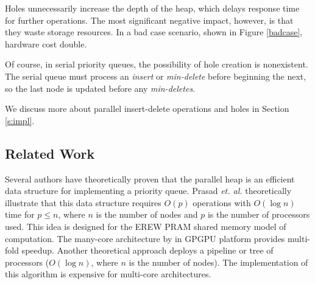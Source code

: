 Holes unnecessarily increase the depth of the heap, which delays response time for further operations.
The most significant negative impact, however, is that they waste storage resources.
In a bad case scenario, shown in Figure \ref{badcase}, hardware cost double.

Of course, in serial priority queues, the possibility of hole creation is nonexistent. 
The serial queue must process an {\it insert} or {\it min-delete} before beginning the next, so the last node is updated before any {\it min-deletes}.

We discuss more about parallel insert-delete operations and holes in Section \autoref{s:impl}.

\subsection{Related Work}
Several authors have theoretically proven that the parallel heap is an efficient data structure for implementing a priority queue.
Prasad {\it et. al.} \cite{pq3} theoretically illustrate that this data structure requires $O(p)$ operations with $O(\log n)$ time for $p \leq n$, where $n$ is the number of nodes and $p$ is the number of processors used.
This idea is designed for the EREW PRAM shared memory model of computation.
The many-core architecture by \cite{pq2} in GPGPU platform provides multi-fold speedup.
Another theoretical approach \cite{pq4} deploys a pipeline or tree of processors ($O(\log n)$, where $n$ is the number of nodes).
The implementation of this algorithm \cite{pq5} is expensive for multi-core architectures.

